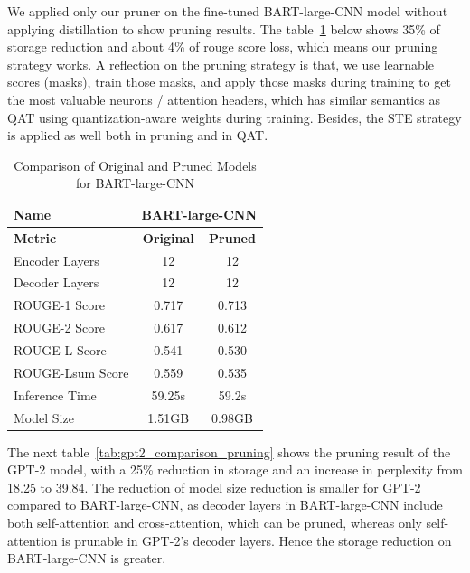 \documentclass{article}
\begin{document}
    \hspace*{1em} We applied only our pruner on the fine-tuned BART-large-CNN model without applying distillation to show pruning results. The table~\ref{tab:BART_comparison_pruning} below shows 35\% of storage reduction and about 4\% of rouge score loss, which means our pruning strategy works. A reflection on the pruning strategy is that, we use learnable scores (masks), train those masks, and apply those masks during training to get the most valuable neurons / attention headers, which has similar semantics as QAT using quantization-aware weights during training. Besides, the STE strategy is applied as well both in pruning and in QAT.

    \begin{table}[h!]
        \centering
        \begin{tabular}{lcc}
            \toprule
            \textbf{Name}         & \multicolumn{2}{c}{\textbf{BART-large-CNN}} \\ \midrule
            \textbf{Metric}       & \textbf{Original} & \textbf{Pruned} \\ \midrule
            Encoder Layers        & 12                     & 12                     \\
            Decoder Layers        & 12                     & 12                     \\
            ROUGE-1 Score         & 0.717                  & 0.713                  \\
            ROUGE-2 Score         & 0.617                  & 0.612                  \\
            ROUGE-L Score         & 0.541                  & 0.530                  \\
            ROUGE-Lsum Score      & 0.559                  & 0.535                  \\
            Inference Time        & 59.25s                 & 59.2s                  \\
            Model Size            & 1.51GB                 & 0.98GB                 \\ \bottomrule
        \end{tabular}
        \caption{Comparison of Original and Pruned Models for BART-large-CNN}
        \label{tab:BART_comparison_pruning}
    \end{table}

    \hspace*{1em} The next table~\ref{tab:gpt2_comparison_pruning} shows the pruning result of the GPT-2 model, with a 25\% reduction in storage and an increase in perplexity from 18.25 to 39.84. The reduction of model size reduction is smaller for GPT-2 compared to BART-large-CNN, as decoder layers in BART-large-CNN include both self-attention and cross-attention, which can be pruned, whereas only self-attention is prunable in GPT-2's decoder layers. Hence the storage reduction on BART-large-CNN is greater.
\end{document}
